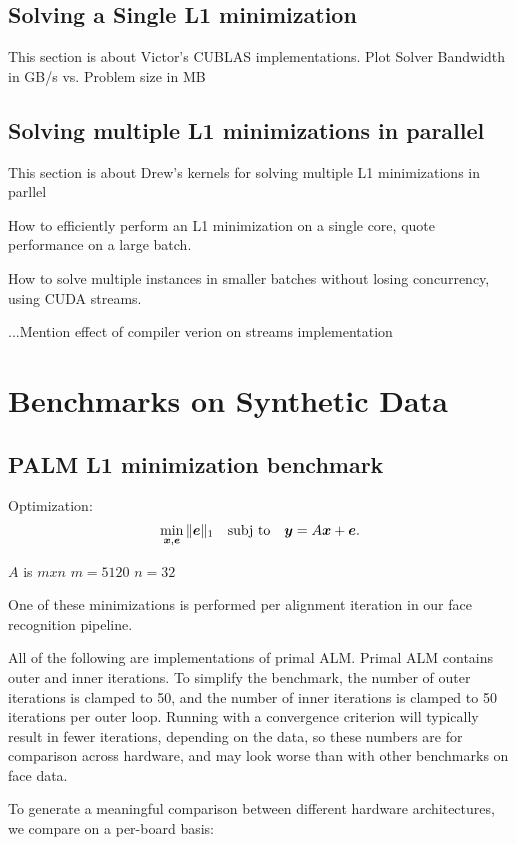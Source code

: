 \documentclass[10pt,twocolumn,letterpaper]{article}
\begin{document}
\subsection{Solving a Single L1 minimization}
This section is about Victor's CUBLAS implementations.
Plot Solver Bandwidth in GB/s vs. Problem size in MB

\subsection{Solving multiple L1 minimizations in parallel}
This section is about Drew's kernels for solving multiple L1 minimizations in parllel

How to efficiently perform an L1 minimization on a single core, quote performance on a large batch.

How to solve multiple instances in smaller batches without losing concurrency, using CUDA streams.

...Mention effect of compiler verion on streams implementation

\section{Benchmarks on Synthetic Data}
\subsection{PALM L1 minimization benchmark}

Optimization:
\begin{equation}
\min_{{\boldsymbol{x}}, \boldsymbol{e}} \|\boldsymbol{e}\|_1 \quad \textup{subj to} \quad {\boldsymbol{y}} = A {\boldsymbol{x}} + \boldsymbol{e}.
\end{equation}

$A$ is $mxn$
$m = 5120$
$n = 32$

One of these minimizations is performed per 
alignment iteration in our face recognition pipeline.

All of the following are implementations of primal ALM.
Primal ALM contains outer and inner iterations.
To simplify the benchmark, the number of outer iterations
is clamped to 50, and the number of inner iterations is
clamped to 50 iterations per outer loop.  Running with
a convergence criterion will typically result in fewer
iterations, depending on the data, so these numbers are
for comparison across hardware, and may look worse than
with other benchmarks on face data.

To generate a meaningful comparison between different hardware
architectures, we compare on a per-board basis:
\end{document}
